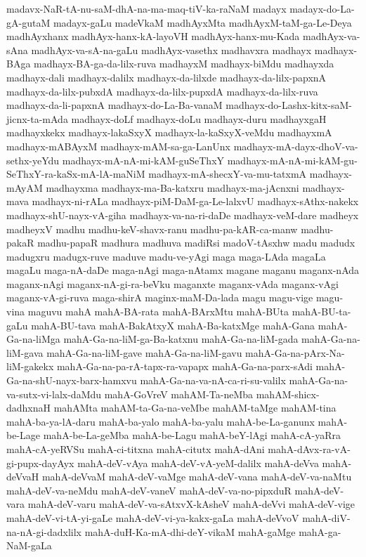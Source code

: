 {madavx-NaR-tA-nu-saM-dhA-na-ma-maq-tiV-ka-raNaM
madayx
madayx-do-La-gA-gutaM
madayx-gaLu
madeVkaM
madhAyxMta
madhAyxM-taM-ga-Le-Deya
madhAyxhanx
madhAyx-hanx-kA-layoVH
madhAyx-hanx-mu-Kada
madhAyx-va-sAna
madhAyx-va-sA-na-gaLu
madhAyx-vasethx
madhavxra
madhayx
madhayx-BAga
madhayx-BA-ga-da-lilx-ruva
madhayxM
madhayx-biMdu
madhayxda
madhayx-dali
madhayx-dalilx
madhayx-da-lilxde
madhayx-da-lilx-papxnA
madhayx-da-lilx-pubxdA
madhayx-da-lilx-pupxdA
madhayx-da-lilx-ruva
madhayx-da-li-papxnA
madhayx-do-La-Ba-vanaM
madhayx-do-Lashx-kitx-saM-jicnx-ta-mAda
madhayx-doLf
madhayx-doLu
madhayx-duru
madhayxgaH
madhayxkekx
madhayx-lakaSxyX
madhayx-la-kaSxyX-veMdu
madhayxmA
madhayx-mABAyxM
madhayx-mAM-sa-ga-LanUnx
madhayx-mA-dayx-dhoV-va-sethx-yeYdu
madhayx-mA-nA-mi-kAM-guSeThxY
madhayx-mA-nA-mi-kAM-gu-SeThxY-ra-kaSx-mA-lA-maNiM
madhayx-mA-shecxY-va-mu-tatxmA
madhayx-mAyAM
madhayxma
madhayx-ma-Ba-katxru
madhayx-ma-jAcnxni
madhayx-mava
madhayx-ni-rALa
madhayx-piM-DaM-ga-Le-lalxvU
madhayx-sAthx-nakekx
madhayx-shU-nayx-vA-giha
madhayx-va-na-ri-daDe
madhayx-veM-dare
madheyx
madheyxV
madhu
madhu-keV-shavx-ranu
madhu-pa-kAR-ca-manw
madhu-pakaR
madhu-papaR
madhura
madhuva
madiRsi
madoV-tAsxhw
madu
madudx
madugxru
madugx-ruve
maduve
madu-ve-yAgi
maga
maga-LAda
magaLa
magaLu
maga-nA-daDe
maga-nAgi
maga-nAtamx
magane
maganu
maganx-nAda
maganx-nAgi
maganx-nA-gi-ra-beVku
maganxte
maganx-vAda
maganx-vAgi
maganx-vA-gi-ruva
maga-shirA
maginx-maM-Da-lada
magu
magu-vige
magu-vina
maguvu
mahA
mahA-BA-rata
mahA-BArxMtu
mahA-BUta
mahA-BU-ta-gaLu
mahA-BU-tava
mahA-BakAtxyX
mahA-Ba-katxMge
mahA-Gana
mahA-Ga-na-liMga
mahA-Ga-na-liM-ga-Ba-katxnu
mahA-Ga-na-liM-gada
mahA-Ga-na-liM-gava
mahA-Ga-na-liM-gave
mahA-Ga-na-liM-gavu
mahA-Ga-na-pArx-Na-liM-gakekx
mahA-Ga-na-pa-rA-tapx-ra-vapapx
mahA-Ga-na-parx-sAdi
mahA-Ga-na-shU-nayx-barx-hamxvu
mahA-Ga-na-va-nA-ca-ri-su-valilx
mahA-Ga-na-va-sutx-vi-lalx-daMdu
mahA-GoVreV
mahAM-Ta-neMba
mahAM-shicx-dadhxnaH
mahAMta
mahAM-ta-Ga-na-veMbe
mahAM-taMge
mahAM-tina
mahA-ba-ya-lA-daru
mahA-ba-yalo
mahA-ba-yalu
mahA-be-La-ganunx
mahA-be-Lage
mahA-be-La-geMba
mahA-be-Lagu
mahA-beY-lAgi
mahA-cA-yaRra
mahA-cA-yeRVSu
mahA-ci-titxna
mahA-citutx
mahA-dAni
mahA-dAvx-ra-vA-gi-pupx-dayAyx
mahA-deV-vAya
mahA-deV-vA-yeM-dalilx
mahA-deVva
mahA-deVvaH
mahA-deVvaM
mahA-deV-vaMge
mahA-deV-vana
mahA-deV-va-naMtu
mahA-deV-va-neMdu
mahA-deV-vaneV
mahA-deV-va-no-pipxduR
mahA-deV-vara
mahA-deV-varu
mahA-deV-va-sAtxvX-kAsheV
mahA-deVvi
mahA-deV-vige
mahA-deV-vi-tA-yi-gaLe
mahA-deV-vi-ya-kakx-gaLa
mahA-deVvoV
mahA-diV-na-nA-gi-dadxlilx
mahA-duH-Ka-mA-dhi-deY-vikaM
mahA-gaMge
mahA-ga-NaM-gaLa
}
